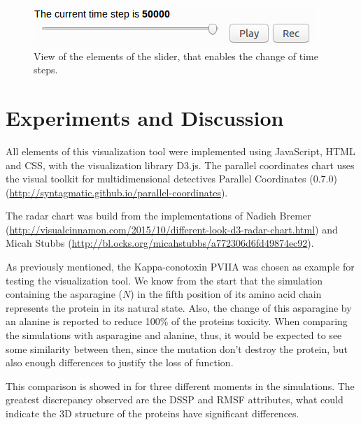 \documentclass[10pt, conference]{IEEEtran}
\begin{document}
\begin{figure}
\includegraphics[width=0.8\linewidth]{figs/slider.png}
\caption{View of the elements of the slider, that enables the change of time steps.} 
\label{fig:slider}
\end{figure}

\section{Experiments and Discussion}
%

All elements of this visualization tool were implemented using JavaScript, HTML and CSS, with the visualization library D3.js. The parallel coordinates chart uses the visual toolkit for multidimensional detectives Parallel Coordinates (0.7.0) (\url{http://syntagmatic.github.io/parallel-coordinates}). 

The radar chart was build from the implementations of Nadieh Bremer (\url{http://visualcinnamon.com/2015/10/different-look-d3-radar-chart.html}) and Micah Stubbs (\url{http://bl.ocks.org/micahstubbs/a772306d6fd49874ec92}). 

As previously mentioned, the Kappa-conotoxin PVIIA was chosen as example for testing the visualization tool. We know from the start that the simulation containing the asparagine ($N$) in the fifth position of its amino acid chain represents the protein in its natural state. Also, the change of this asparagine by an alanine is reported to reduce 100\% of the proteins toxicity. When comparing the simulations with asparagine and alanine, thus, it would be expected to see some similarity between then, since the mutation don't destroy the protein, but also enough differences to justify the loss of function. 

This comparison is showed in  for three different moments in the simulations. The greatest discrepancy observed are the DSSP and RMSF attributes, what could indicate the 3D structure of the proteins have significant differences.

\end{document}

